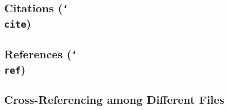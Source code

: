 \subsection{Citations (\texttt{\char`\\cite})}
\label{sec:citations}


\subsection{References (\texttt{\char`\\ref})}
\label{sec:references}


\subsection{Cross-Referencing among Different Files}
\label{sec:cross-references}

